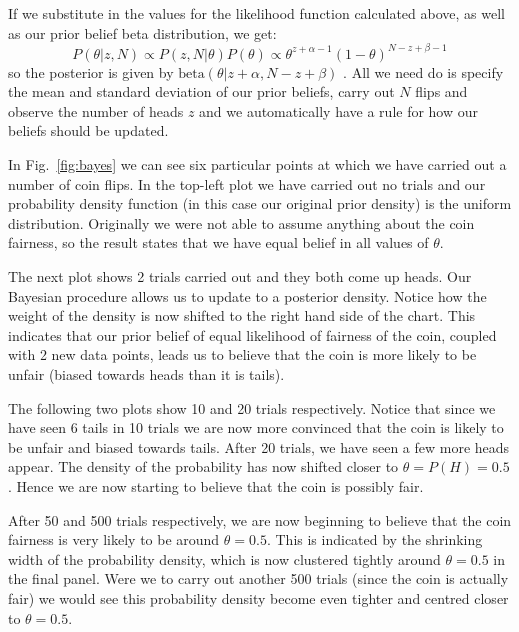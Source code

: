 If we substitute in the values for the likelihood function calculated above, as well as our prior belief beta distribution, we get:
\begin{equation}
  P(\theta|z,N)\propto P(z,N|\theta)P(\theta)\propto \theta^{z+\alpha - 1}(1-\theta)^{N-z+\beta -1} 
\end{equation}
so the posterior is given by $\textrm{beta}(\theta|z+\alpha,N-z+\beta)$ .
All we need do is specify the mean and standard deviation of our prior beliefs, carry out $N$ flips and observe the number of heads $z$ and we automatically have a rule for how our beliefs should be updated.

In Fig.~\ref{fig:bayes} we can see six particular points at which we have carried out a number of coin flips. In the top-left plot we have carried out no trials and our probability density function (in this case our original prior density) is the uniform distribution.
Originally we were not able to assume anything about the coin fairness, so the result states that we have equal belief in all values of $\theta$.

The next plot shows 2 trials carried out and they both come up heads. Our Bayesian procedure allows us to update to a posterior density. Notice how the weight of the density is now shifted to the right hand side of the chart. This indicates that our prior belief of equal likelihood of fairness of the coin, coupled with 2 new data points, leads us to believe that the coin is more likely to be unfair (biased towards heads than it is tails).

The following two plots show 10 and 20 trials respectively. Notice that since we have seen 6 tails in 10 trials we are now more convinced that the coin is likely to be unfair and biased towards tails. After 20 trials, we have seen a few more heads appear. The density of the probability has now shifted closer to $\theta = P(H) = 0.5$. Hence we are now starting to believe that the coin is possibly fair.

After 50 and 500 trials respectively, we are now beginning to believe that the coin fairness is very likely to be around $\theta=0.5$. This is indicated by the shrinking width of the probability density, which is now clustered tightly around $\theta=0.5$ in the final panel. Were we to carry out another 500 trials (since the coin is actually fair) we would see this probability density become even tighter and centred closer to $\theta=0.5$.

